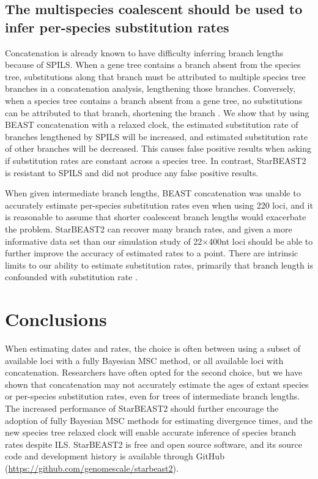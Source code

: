 \documentclass[12pt]{article}
\begin{document}
\subsection{The multispecies coalescent should be used to infer per-species substitution rates}

Concatenation is already known to have difficulty inferring branch lengths
because of SPILS. When a gene tree contains a branch absent from the species
tree, substitutions along that branch must be attributed to multiple species tree
branches in a concatenation analysis, lengthening those branches. Conversely,
when a species tree contains a branch absent from a gene tree, no substitutions
can be attributed to that branch, shortening the branch \citep{Mendes01072016}.
We show that by using BEAST concatenation with a relaxed
clock, the estimated substitution rate of branches lengthened by
SPILS will be increased, and estimated substitution rate of other
branches will be decreased. This causes false positive results when asking if substitution rates
are constant across a species tree. In contrast, StarBEAST2 is resistant to
SPILS and did not produce any false positive results.

When given intermediate branch lengths, BEAST concatenation was unable to accurately
estimate per-species substitution rates even when using 220 loci, and it is
reasonable to assume that shorter coalescent branch lengths would
exacerbate the problem. StarBEAST2 can recover many branch rates, and given a
more informative data set than our simulation study of 22$\times$400nt loci
should be able to further improve the accuracy of estimated rates to a point.
There are intrinsic limits to our ability to estimate substitution rates,
primarily that branch length is confounded with substitution rate
\citep{Thorne01092002}.

\section{Conclusions}

When estimating dates and rates, the choice is often between using a subset of
available loci with a fully Bayesian MSC method, or all available loci with
concatenation. Researchers have often opted for the second choice, but we have
shown that concatenation may not accurately estimate the ages of extant species
or per-species substitution rates, even for trees of intermediate branch lengths. The
increased performance of StarBEAST2 should further encourage the adoption of
fully Bayesian MSC methods for estimating divergence times, and the new species
tree relaxed clock will enable accurate inference of species branch rates despite
ILS. StarBEAST2 is free and open source software, and its source code and
development history is available through GitHub
(\url{https://github.com/genomescale/starbeast2}).
\end{document}
